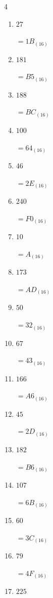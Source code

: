 \begin{multicols}{4}
\begin{enumerate}
  \item $27$

        $=1B_{(16)}$

  \item $181$

        $=B5_{(16)}$

  \item $188$

        $=BC_{(16)}$

  \item $100$

        $=64_{(16)}$

\columnbreak %

  \item $46$

        $=2E_{(16)}$

  \item $240$

        $=F0_{(16)}$

  \item $10$

        $=A_{(16)}$

  \item $173$

        $=AD_{(16)}$

  \item $50$

        $=32_{(16)}$

  \item $67$

        $=43_{(16)}$

  \item $166$

        $=A6_{(16)}$

  \item $45$

        $=2D_{(16)}$

  \item $182$

        $=B6_{(16)}$

  \item $107$

        $=6B_{(16)}$

  \item $60$

        $=3C_{(16)}$

  \item $79$

        $=4F_{(16)}$

  \item $225$


\end{enumerate}
\end{multicols}
